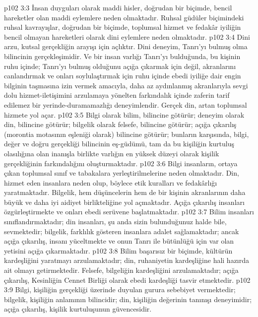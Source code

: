 \vs p102 3:3 İnsan duyguları olarak maddi hisler, doğrudan bir biçimde, bencil hareketler olan maddi eylemlere neden olmaktadır. Ruhsal güdüler biçimindeki ruhsal kavrayışlar, doğrudan bir biçimde, toplumsal hizmet ve fedakâr iyiliğin bencil olmayan hareketleri olarak dini eylemlere neden olmaktadır.
\vs p102 3:4 Dini arzu, kutsal gerçekliğin arayışı için açlıktır. Dini deneyim, Tanrı’yı bulmuş olma bilincinin gerçekleşimidir. Ve bir insan varlığı Tanrı’yı bulduğunda, bu kişinin ruhu içinde; Tanrı’yı bulmuş olduğunu açığa çıkarmak için değil, akranlarını canlandırmak ve onları soylulaştırmak için ruhu içinde ebedi iyiliğe dair engin bilginin taşmasına izin vermek amacıyla, daha az aydınlanmış akranlarıyla sevgi dolu hizmet\hyp{}iletişimini arzulamaya yönelten farkındalık içinde zaferin tarif edilemez bir yerinde\hyp{}duramamazlığı deneyimlendir. Gerçek din, artan toplumsal hizmete yol açar.
\vs p102 3:5 Bilgi olarak bilim,  bilincine götürür; deneyim olarak din,  bilincine götürür; bilgelik olarak felsefe,  bilincine götürür; açığa çıkarılış (morontia motasının eşleniği olarak)  bilincine götürür; bunların karşısında, bilgi, değer ve doğru gerçekliği bilincinin eş\hyp{}güdümü, tam da bu kişiliğin kurtuluş olasılığına olan inanışla birlikte varlığın en yüksek düzeyi olarak kişilik gerçekliğinin farkındalığını oluşturmaktadır.
\vs p102 3:6 Bilgi insanların, ortaya çıkan toplumsal sınıf ve tabakalara yerleştirilmelerine neden olmaktadır. Din, hizmet eden insanlara neden olup, böylece etik kuralları ve fedakârlığı yaratmaktadır. Bilgelik, hem düşüncelerin hem de bir kişinin akranlarının daha büyük ve daha iyi aidiyet birlikteliğine yol açmaktadır. Açığa çıkarılış insanları özgürleştirmekte ve onları ebedi serüvene başlatmaktadır.
\vs p102 3:7 Bilim insanları sınıflandırmaktadır; din insanları, şu anda sizin bulunduğunuz halde bile, sevmektedir; bilgelik, farklılık gösteren insanlara adalet sağlamaktadır; ancak açığa çıkarılış, insanı yüceltmekte ve onun Tanrı ile bütünlüğü için var olan yetisini açığa çıkarmaktadır.
\vs p102 3:8 Bilim başarısız bir biçimde, kültürün kardeşliğini yaratmayı arzulamaktadır; din, ruhaniyetin kardeşliğine hali hazırda ait olmayı getirmektedir. Felsefe, bilgeliğin kardeşliğini arzulamaktadır; açığa çıkarılış, Kesinliğin Cennet Birliği olarak ebedi kardeşliği tasvir etmektedir.
\vs p102 3:9 Bilgi, kişiliğin gerçekliği üzerinde duyulan gurura sebebiyet vermektedir; bilgelik, kişiliğin anlamının bilincidir; din, kişiliğin değerinin tanınışı deneyimidir; açığa çıkarılış, kişilik kurtuluşunun güvencesidir.
